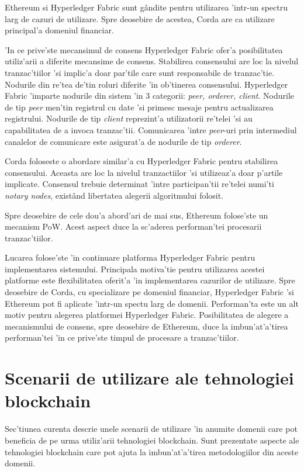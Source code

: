\documentclass[12pt,a4paper,twoside]{report}
\begin{document}
Ethereum si Hyperledger Fabric sunt g\^andite pentru utilizarea 'intr-un spectru larg de cazuri de utilizare. Spre deosebire de acestea, Corda are ca utilizare principal'a domeniul financiar\cite{cordadoc}.

'In ce prive'ste mecansimul de consens Hyperledger Fabric ofer'a posibilitatea utiliz'arii a diferite mecansime de consens. Stabilirea consensului are loc la  nivelul tranzac'tiilor 'si implic'a doar par'tile care sunt responsabile de  tranzac'tie. Nodurile din re'tea de'tin roluri diferite 'in ob'tinerea consensului. Hyperledger Fabric 'imparte nodurile din sistem 'in 3 categorii: \emph{peer, orderer, client}\cite{fabricdoc}\cite{hlfv}. Nodurile de tip \emph{peer} men'tin registrul cu date 'si primesc mesaje pentru actualizarea registrului. Nodurile de tip \emph{client} reprezint'a utilizatorii re'telei 'si au capabilitatea de a invoca tranzac'tii. Comunicarea 'intre \emph{peer}-uri prin intermediul canalelor de comunicare este asigurat'a de nodurile de tip \emph{orderer}.

Corda foloseste o abordare similar'a cu Hyperledger Fabric pentru stabilirea consensului. Aceasta are loc la nivelul tranzactiilor 'si utilizeaz'a doar p'artile implicate. Consensul trebuie determinat 'intre participan'tii re'telei numi'ti \emph{notary nodes}\cite{cordadoc}, exist\^and libertatea alegerii algoritmului folosit.

Spre deosebire de cele dou'a abord'ari de mai sus, Ethereum folose'ste un mecanism PoW. Acest aspect duce la sc'aderea performan'tei procesarii tranzac'tiilor. 

Lucarea folose'ste 'in continuare platforma Hyperledger Fabric pentru implementarea sistemului. Principala motiva'tie pentru utilizarea acestei platforme este flexibilitatea oferit'a 'in implementarea cazurilor de utilizare. Spre deosebire de Corda, cu specializare pe domeniul financiar, Hyperledger Fabric 'si Ethereum pot fi aplicate 'intr-un spectu larg de domenii. Performan'ta este un alt motiv pentru alegerea platformei Hyperledger Fabric. Posibilitatea de alegere a mecanismului de consens, spre deosebire de Ethereum, duce la imbun'at'a'tirea performan'tei 'in ce prive'ste timpul de procesare a tranzac'tiilor. 

\section{Scenarii de utilizare ale tehnologiei blockchain}
Sec'tiunea curenta descrie unele scenarii de utilizare 'in anumite domenii care pot beneficia de pe urma utiliz'arii tehnologiei blockchain. Sunt prezentate aspecte ale tehnologiei blockchain care pot ajuta la imbun'at'a'tirea metodologiilor din aceste domenii.
\end{document}
